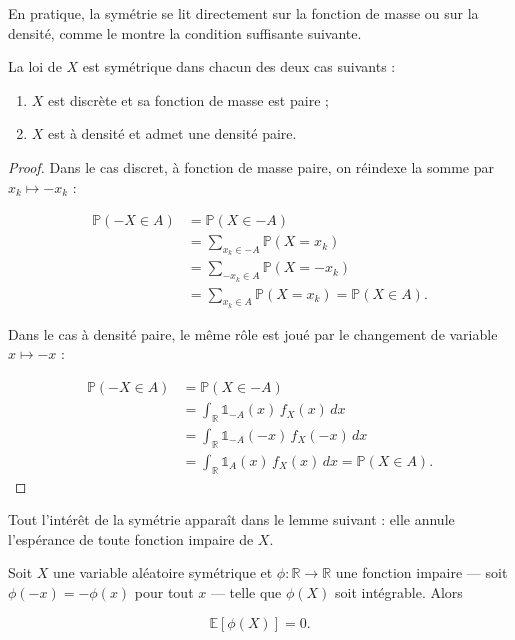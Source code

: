 En pratique, la symétrie se lit directement sur la fonction de masse ou sur la densité, comme le montre la condition suffisante suivante.

\medskip

\begin{mdframed}
\begin{lemme}
La loi de $X$ est symétrique dans chacun des deux cas suivants :
\begin{enumerate}
\item $X$ est discrète et sa fonction de masse est paire ;
\item $X$ est à densité et admet une densité paire.
\end{enumerate}
\end{lemme}
\end{mdframed}

\begin{proof}
Dans le cas discret, à fonction de masse paire, on réindexe la somme par $x_k \mapsto -x_k$ :

\begin{align*}
\mathbb{P}(-X \in A) &= \mathbb{P}(X \in -A) \\
&= \sum_{x_k \in -A} \mathbb{P}(X = x_k) \\
&= \sum_{-x_k \in A} \mathbb{P}(X = -x_k) \\
&= \sum_{x_k \in A} \mathbb{P}(X = x_k) = \mathbb{P}(X \in A).
\end{align*}

Dans le cas à densité paire, le même rôle est joué par le changement de variable $x \mapsto -x$ :

\begin{align*}
\mathbb{P}(-X \in A) &= \mathbb{P}(X \in -A) \\
&= \int_{\mathbb{R}} \mathbb{1}_{-A}(x)\, f_X(x)\, dx \\
&= \int_{\mathbb{R}} \mathbb{1}_{-A}(-x)\, f_X(-x)\, dx \\
&= \int_{\mathbb{R}} \mathbb{1}_A(x)\, f_X(x)\, dx = \mathbb{P}(X \in A).
\end{align*}
\end{proof}

Tout l'intérêt de la symétrie apparaît dans le lemme suivant : elle annule l'espérance de toute fonction impaire de $X$.

\medskip

\begin{mdframed}
\begin{lemme}
Soit $X$ une variable aléatoire symétrique et $\phi : \mathbb{R} \to \mathbb{R}$ une fonction impaire — soit $\phi(-x) = -\phi(x)$ pour tout $x$ — telle que $\phi(X)$ soit intégrable. Alors

$$
\mathbb{E}[\phi(X)] = 0.
$$
\end{lemme}
\end{mdframed}

